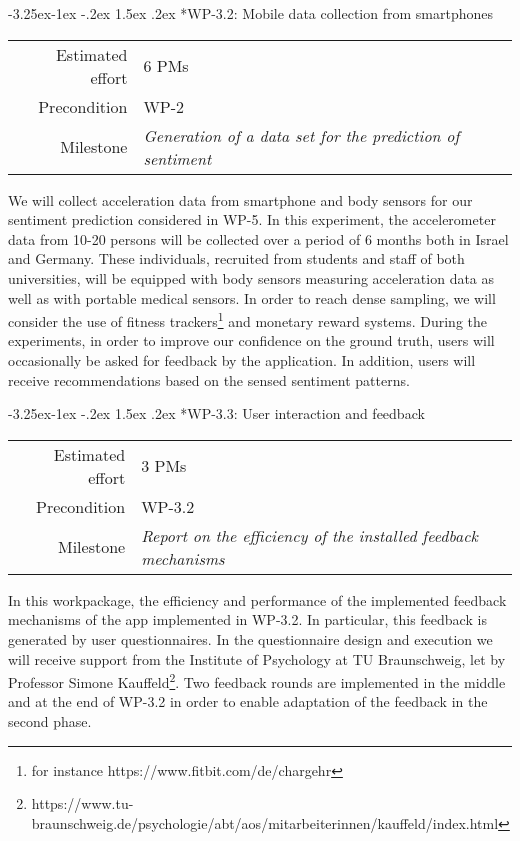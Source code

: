 \documentclass[12pt]{article}
\makeatletter
\newcommand{\kobyc}[1]{\begin{center}\fbox{\parbox{3in}{{\textcolor{green}{K: #1}}}}\end{center}}
\renewcommand\paragraph{\@startsection{paragraph}{4}{\z@}%
  {-3.25ex\@plus -1ex \@minus -.2ex}%
  {1.5ex \@plus .2ex}%
  {\normalfont\normalsize\bfseries}}
\makeatother
\begin{document}
\paragraph*{WP-3.2: Mobile data collection from smartphones}
\begin{tabular}{rl}
 Estimated effort& 6 PMs\\
 Precondition & WP-2\\
 Milestone & \begin{minipage}[t]{12.2cm}
\textit{Generation of a data set for the prediction of sentiment}\vspace{.2cm}
             \end{minipage}
\end{tabular}

\noindent
We will collect acceleration data from smartphone and body sensors for our sentiment prediction considered in WP-5. 
In this experiment, the accelerometer data from 10-20 persons will be collected over a period of 6 months both in Israel and Germany. 
These individuals, recruited from students and staff of both universities, will be equipped with body sensors measuring acceleration data as well as with portable medical sensors. 
In order to reach dense sampling, we will consider the use of fitness trackers\footnote{for instance https://www.fitbit.com/de/chargehr} and monetary reward systems. 
During the experiments, in order to improve our confidence on the ground truth, users will occasionally be asked for feedback by the application.
In addition, users will receive recommendations based on the sensed sentiment patterns. 


\paragraph*{WP-3.3: User interaction and feedback}
\begin{tabular}{rl}
 Estimated effort& 3 PMs\\
 Precondition & WP-3.2\\
 Milestone & \begin{minipage}[t]{12.2cm}
\textit{Report on the efficiency of the installed feedback mechanisms}\vspace{.2cm}
             \end{minipage}
\end{tabular}

\noindent
In this workpackage, the efficiency and performance of the implemented feedback mechanisms of the app implemented in WP-3.2.
In particular, this feedback is generated by user questionnaires.
In the questionnaire design and execution we will receive support from the Institute of Psychology at TU Braunschweig, let by Professor Simone Kauffeld\footnote{https://www.tu-braunschweig.de/psychologie/abt/aos/mitarbeiterinnen/kauffeld/index.html}.
Two feedback rounds are implemented in the middle and at the end of WP-3.2 in order to enable adaptation of the feedback in the second phase. 
\end{document}
